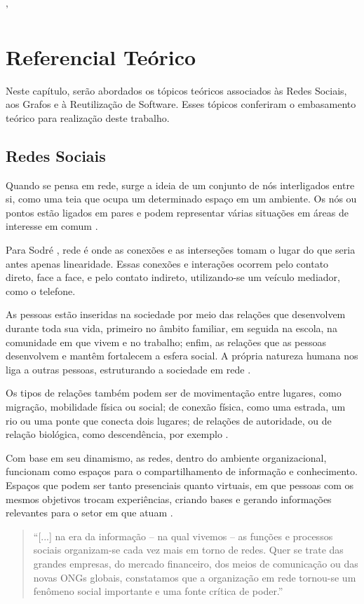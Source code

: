 '\chapter{Referencial Teórico}
\label{chapter:Referencial_Teorico}

Neste capítulo, serão abordados os tópicos teóricos associados às Redes Sociais, aos Grafos e à Reutilização de Software. Esses tópicos conferiram o embasamento teórico para realização deste trabalho.

\section{Redes Sociais}

Quando se pensa em rede, surge a ideia de um conjunto de nós interligados entre si, como uma teia que ocupa um determinado espaço em um ambiente. Os nós ou pontos estão ligados em pares e podem representar várias situações em áreas de interesse em comum \cite{Newman:2010}.

Para Sodré \cite{Sodre:2002}, rede é onde as conexões e as interseções tomam o lugar do que seria antes apenas linearidade. Essas conexões e interações ocorrem pelo contato direto, face a face, e pelo contato indireto, utilizando-se um veículo mediador, como o telefone.

As pessoas estão inseridas na sociedade por meio das relações que desenvolvem durante toda sua vida, primeiro no âmbito familiar, em seguida na escola, na comunidade em que vivem e no trabalho; enfim, as relações que as pessoas desenvolvem e mantêm fortalecem a esfera social. A própria natureza humana nos liga a outras pessoas, estruturando a sociedade em rede \cite{Tomae:Alcara:Chiara:2005}.

Os tipos de relações também podem ser de movimentação entre lugares, como migração, mobilidade física ou social; de conexão física, como uma estrada, um rio ou uma ponte que conecta dois lugares; de relações de autoridade, ou de relação biológica, como descendência, por exemplo \cite{Wasserman:1994}.

Com base em seu dinamismo, as redes, dentro do ambiente organizacional, funcionam como espaços para o compartilhamento de informação e conhecimento. Espaços que podem ser tanto presenciais quanto virtuais, em que pessoas com os mesmos objetivos trocam experiências, criando bases e gerando informações relevantes para o setor em que atuam \cite{Tomae:Alcara:Chiara:2005}.

\begin{quote}
	``[...] na era da informação – na qual vivemos – as
	funções e processos sociais organizam-se cada vez
	mais em torno de redes. Quer se trate das grandes
	empresas, do mercado financeiro, dos meios de
	comunicação ou das novas ONGs globais,
	constatamos que a organização em rede tornou-se
	um fenômeno social importante e uma fonte crítica
	de poder.'' \cite{Capra:2002}
\end{quote}

